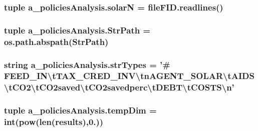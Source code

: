 \hypertarget{namespacea__policies_analysis_a9359e1efd8f0e4d00093c62dd1f20592}{
\subsubsection[{solar\-N}]{\setlength{\rightskip}{0pt plus 5cm}tuple a\-\_\-policies\-Analysis.\-solar\-N = file\-F\-I\-D.\-readlines()}}\label{namespacea__policies_analysis_a9359e1efd8f0e4d00093c62dd1f20592}
\hypertarget{namespacea__policies_analysis_a27fd3cf49aa14595d610558b0472b873}{
\subsubsection[{Str\-Path}]{\setlength{\rightskip}{0pt plus 5cm}tuple a\-\_\-policies\-Analysis.\-Str\-Path = os.\-path.\-abspath(Str\-Path)}}\label{namespacea__policies_analysis_a27fd3cf49aa14595d610558b0472b873}
\hypertarget{namespacea__policies_analysis_a3a766cb38cc94e08b185d9dbfef05a9e}{
\subsubsection[{str\-Types}]{\setlength{\rightskip}{0pt plus 5cm}string a\-\_\-policies\-Analysis.\-str\-Types = '\# F\-E\-E\-D\-\_\-\-I\-N\textbackslash{}t\-T\-A\-X\-\_\-\-C\-R\-E\-D\-\_\-\-I\-N\-V\textbackslash{}tn\-A\-G\-E\-N\-T\-\_\-\-S\-O\-L\-A\-R\textbackslash{}t\-A\-I\-D\-S\textbackslash{}t\-C\-O2\textbackslash{}t\-C\-O2saved\textbackslash{}t\-C\-O2savedperc\textbackslash{}t\-D\-E\-B\-T\textbackslash{}t\-C\-O\-S\-T\-S\textbackslash{}n'}}\label{namespacea__policies_analysis_a3a766cb38cc94e08b185d9dbfef05a9e}
\hypertarget{namespacea__policies_analysis_a660b69c1bc10800977daca0cb962ac7f}{
\subsubsection[{temp\-Dim}]{\setlength{\rightskip}{0pt plus 5cm}tuple a\-\_\-policies\-Analysis.\-temp\-Dim = int(pow(len({\bf results}),0.))}}\label{namespacea__policies_analysis_a660b69c1bc10800977daca0cb962ac7f}
